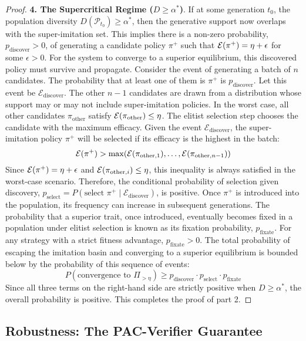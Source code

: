 \begin{proof}
\noindent\textbf{4. The Supercritical Regime ($D \ge \alpha^*$)}.
If at some generation $t_0$, the population diversity $D(\mathcal{P}_{t_0}) \ge \alpha^*$, then the generative support now overlaps with the super-imitation set. This implies there is a non-zero probability, $p_{\text{discover}} > 0$, of generating a candidate policy $\pi^+$ such that $\mathcal{E}(\pi^+) = \eta + \epsilon$ for some $\epsilon > 0$.
For the system to converge to a superior equilibrium, this discovered policy must survive and propagate. Consider the event of generating a batch of $n$ candidates. The probability that at least one of them is $\pi^+$ is $p_{\text{discover}}$. Let this event be $\mathcal{E}_{\text{discover}}$.
The other $n-1$ candidates are drawn from a distribution whose support may or may not include super-imitation policies. In the worst case, all other candidates $\pi_{\text{other}}$ satisfy $\mathcal{E}(\pi_{\text{other}}) \le \eta$.
The elitist selection step chooses the candidate with the maximum efficacy. Given the event $\mathcal{E}_{\text{discover}}$, the super-imitation policy $\pi^+$ will be selected if its efficacy is the highest in the batch:
\[ \mathcal{E}(\pi^+) > \max(\mathcal{E}(\pi_{\text{other}, 1}), \dots, \mathcal{E}(\pi_{\text{other}, n-1})) \]
Since $\mathcal{E}(\pi^+) = \eta + \epsilon$ and $\mathcal{E}(\pi_{\text{other}, i}) \le \eta$, this inequality is always satisfied in the worst-case scenario. Therefore, the conditional probability of selection given discovery, $p_{\text{select}} = P(\text{select } \pi^+ \mid \mathcal{E}_{\text{discover}})$, is positive.
Once $\pi^+$ is introduced into the population, its frequency can increase in subsequent generations. The probability that a superior trait, once introduced, eventually becomes fixed in a population under elitist selection is known as its fixation probability, $p_{\text{fixate}}$. For any strategy with a strict fitness advantage, $p_{\text{fixate}} > 0$.
The total probability of escaping the imitation basin and converging to a superior equilibrium is bounded below by the probability of this sequence of events:
\[ P(\text{convergence to } \Pi_{> \eta}) \ge p_{\text{discover}} \cdot p_{\text{select}} \cdot p_{\text{fixate}} \]
Since all three terms on the right-hand side are strictly positive when $D \ge \alpha^*$, the overall probability is positive. This completes the proof of part 2.
\end{proof}

\subsection{Robustness: The PAC-Verifier Guarantee}
